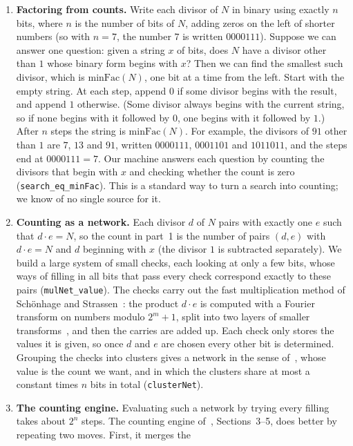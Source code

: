 \documentclass[11pt]{article}
\newcommand{\code}[1]{\texttt{#1}}
\begin{document}
\begin{enumerate}
\item \textbf{Factoring from counts.} Write each divisor of $N$ in binary using exactly $n$ bits, where $n$ is
  the number of bits of $N$, adding zeros on the left of shorter numbers (so with $n=7$, the number $7$ is
  written $0000111$). Suppose we can answer one question: given a string $x$ of bits, does $N$ have a divisor
  other than $1$ whose binary form begins with $x$? Then we can find the smallest such divisor, which is
  $\mathrm{minFac}(N)$, one bit at a time from the left. Start with the empty string. At each step, append $0$
  if some divisor begins with the result, and append $1$ otherwise. (Some divisor always begins with the
  current string, so if none begins with it followed by $0$, one begins with it followed by $1$.) After $n$
  steps the string is $\mathrm{minFac}(N)$. For example, the divisors of $91$ other than $1$ are $7$, $13$ and
  $91$, written $0000111$, $0001101$ and $1011011$, and the steps end at $0000111=7$. Our machine answers each
  question by counting the divisors that begin with $x$ and checking whether the count is zero
  (\code{search\_eq\_minFac}). This is a standard way to turn a search into counting; we know of no single
  source for it.
\item \textbf{Counting as a network.} Each divisor $d$ of $N$ pairs with exactly one $e$ such that
  $d\cdot e=N$, so the count in part~1 is the number of pairs $(d,e)$ with $d\cdot e=N$ and $d$ beginning with
  $x$ (the divisor $1$ is subtracted separately). We build a large system of small checks, each looking at only
  a few bits, whose ways of filling in all bits that pass every check correspond exactly to these pairs
  (\code{mulNet\_value}). The checks carry out the fast multiplication method of Sch\"onhage and
  Strassen~\cite{SS71}: the product $d\cdot e$ is computed with a Fourier transform on numbers modulo $2^m+1$,
  split into two layers of smaller transforms~\cite{CT65,Bai90}, and then the carries are added up. Each check
  only stores the values it is given, so once $d$ and $e$ are chosen every other bit is determined. Grouping
  the checks into clusters gives a network in the sense of~\cite{Cla26}, whose value is the count we want, and
  in which the clusters share at most a constant times $n$ bits in total (\code{clusterNet}).
\item \textbf{The counting engine.} Evaluating such a network by trying every filling takes about $2^n$ steps.
  The counting engine of~\cite{Cla26}, Sections~3--5, does better by repeating two moves. First, it merges the

\end{enumerate}
\end{document}

